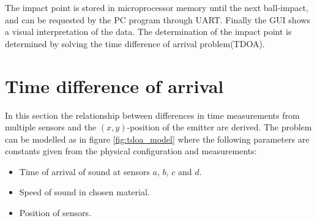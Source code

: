 	The impact point is stored in microprocessor memory until the next ball-impact, and can be requested by the PC program through UART.
	Finally the GUI shows a visual interpretation of the data. The determination of the impact point is determined by solving the time difference of arrival problem(TDOA).
	\section{Time difference of arrival}
	In this section the relationship between differences in time measurements from multiple sensors and the $(x,y)$-position of the emitter are derived.
	The problem can be modelled as in figure \ref{fig:tdoa_model} where the following parameters are constants given from the physical configuration and measurements:
	\begin{itemize}
		\item Time of arrival of sound at sensors $a$, $b$, $c$ and $d$.
		\item Speed of sound in chosen material.
		\item Position of sensors.
	\end{itemize}

